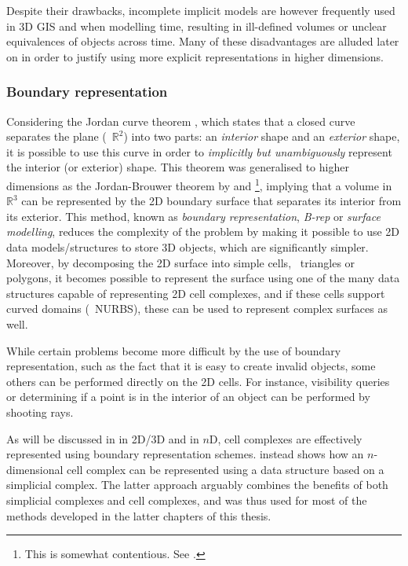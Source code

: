Despite their drawbacks, incomplete implicit models are however frequently used in 3D GIS and when modelling time, resulting in ill-defined volumes or unclear equivalences of objects across time.
Many of these disadvantages are alluded later on in order to justify using more explicit representations in higher dimensions.

\subsubsection{Boundary representation}

Considering the Jordan curve theorem \citep{Jordan87}, which states that a closed curve separates the plane (\ie\ $\mathbb{R}^2$) into two parts: an \emph{interior} shape and an \emph{exterior} shape, it is possible to use this curve in order to \emph{implicitly but unambiguously} represent the interior (or exterior) shape.
This theorem was generalised to higher dimensions as the Jordan-Brouwer theorem by \citet{Lebesgue11} and \citet{Brouwer11}\footnote{This is somewhat contentious. See \citet[Ch.~5]{van-Dalen13}.}, implying that a volume in $\mathbb{R}^3$ can be represented by the 2D boundary surface that separates its interior from its exterior.
This method, known as \emph{boundary representation}, \emph{B-rep} or \emph{surface modelling}, reduces the complexity of the problem by making it possible to use 2D data models/structures to store 3D objects, which are significantly simpler.
Moreover, by decomposing the 2D surface into simple cells, \eg\ triangles or polygons, it becomes possible to represent the surface using one of the many data structures capable of representing 2D cell complexes, and if these cells support curved domains (\eg\ NURBS), these can be used to represent complex surfaces as well.

While certain problems become more difficult by the use of boundary representation, such as the fact that it is easy to create invalid objects, some others can be performed directly on the 2D cells.
For instance, visibility queries or determining if a point is in the interior of an object can be performed by shooting rays.

As will be discussed in  in 2D/3D and  in $n$D, cell complexes are effectively represented using boundary representation schemes.
 instead shows how an $n$-dimensional cell complex can be represented using a data structure based on a simplicial complex.
The latter approach arguably combines the benefits of both simplicial complexes and cell complexes, and was thus used for most of the methods developed in the latter chapters of this thesis.

